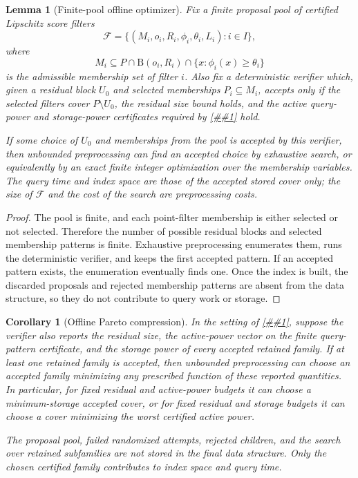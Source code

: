 \documentclass[10pt]{article}
\newcommand{\cref}[1]{\ref{##1}}
\newtheorem{lemma}[theorem]{Lemma}
\newtheorem{corollary}[theorem]{Corollary}
\theoremstyle{definition}
\newcommand{\Ball}{\mathrm{B}}
\begin{document}
\begin{lemma}[Finite-pool offline optimizer]\label{lem:finite-pool-optimizer}
   Fix a finite proposal pool of certified Lipschitz score filters
   \[
      \mathcal F=\{(M_i,o_i,R_i,\phi_i,\theta_i,L_i):i\in I\},
   \]
   where
   \[
      M_i\subseteq
      P\cap\Ball(o_i,R_i)\cap\{x:\phi_i(x)\ge\theta_i\}
   \]
   is the admissible membership set of filter $i$.  Also fix a deterministic
   verifier which, given a residual block $U_0$ and selected memberships
   $P_i\subseteq M_i$, accepts only if the selected filters cover
   $P\setminus U_0$, the residual size bound holds, and the active query-power
   and storage-power certificates required by \cref{asm:weak-offline-score-cover}
   hold.

   If some choice of $U_0$ and memberships from the pool is accepted by this
   verifier, then unbounded preprocessing can find an accepted choice by
   exhaustive search, or equivalently by an exact finite integer optimization
   over the membership variables.  The query time and index space are those of
   the accepted stored cover only; the size of $\mathcal F$ and the cost of the
   search are preprocessing costs.
\end{lemma}

\begin{proof}
   The pool is finite, and each point-filter membership is either selected or
   not selected.  Therefore the number of possible residual blocks and selected
   membership patterns is finite.  Exhaustive preprocessing enumerates them,
   runs the deterministic verifier, and keeps the first accepted pattern.  If an
   accepted pattern exists, the enumeration eventually finds one.  Once the
   index is built, the discarded proposals and rejected membership patterns are
   absent from the data structure, so they do not contribute to query work or
   storage.
\end{proof}

\begin{corollary}[Offline Pareto compression]\label{cor:offline-pareto-compression}
   In the setting of \cref{lem:finite-pool-optimizer}, suppose the verifier
   also reports the residual size, the active-power vector on the finite
   query-pattern certificate, and the storage power of every accepted retained
   family.  If at least one retained family is accepted, then unbounded
   preprocessing can choose an accepted family minimizing any prescribed
   function of these reported quantities.  In particular, for fixed residual
   and active-power budgets it can choose a minimum-storage accepted cover, or
   for fixed residual and storage budgets it can choose a cover minimizing the
   worst certified active power.

   The proposal pool, failed randomized attempts, rejected children, and the
   search over retained subfamilies are not stored in the final data structure.
   Only the chosen certified family contributes to index space and query time.
\end{corollary}
\end{document}
